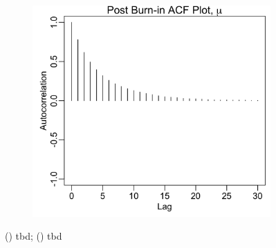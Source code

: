 \documentclass{uwstat572}
\begin{document}
\begin{figure}[H]
\begin{subfigure}[b]{0.49\textwidth}
		\includegraphics[width=\textwidth]{figures/mcmc_acf_plot_mu.png}
		\caption{}
		\label{fig:acf_mu}
	\end{subfigure}
	\caption{() tbd; () tbd }
	\label{fig:data_plot}
\end{figure} 
\end{document}
